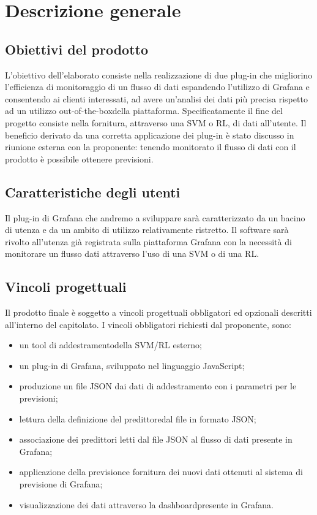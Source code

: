 \section{Descrizione generale}
   
	\subsection{Obiettivi del prodotto}
	L’obiettivo dell’elaborato consiste nella realizzazione di due plug-in che migliorino l’efficienza di monitoraggio di un flusso di dati espandendo l’utilizzo di Grafana e consentendo ai clienti  interessati, ad avere un’analisi dei dati più precisa rispetto ad un utilizzo out-of-the-box\glo della piattaforma. Specificatamente il fine del progetto consiste nella fornitura, attraverso una SVM o RL, di dati all’utente. Il beneficio derivato da una corretta applicazione dei plug-in è stato discusso in riunione esterna con la proponente: tenendo monitorato il flusso di dati con il prodotto è possibile ottenere previsioni. 
	\subsection{Caratteristiche degli utenti}
	Il plug-in di Grafana che andremo a sviluppare sarà caratterizzato da un bacino di utenza e da un ambito di utilizzo relativamente ristretto.
Il software sarà rivolto all’utenza già registrata sulla piattaforma Grafana con la necessità di monitorare un flusso dati attraverso l’uso di una SVM o di una RL.

	 \subsection{Vincoli progettuali}
	 Il prodotto finale è soggetto a vincoli progettuali obbligatori ed opzionali descritti all’interno del capitolato. I vincoli obbligatori richiesti dal proponente, sono:

	 	\begin{itemize}
			\item un tool di addestramento\glo della SVM/RL esterno;
	 		\item un plug-in di Grafana, sviluppato nel linguaggio JavaScript;
	 		\item produzione un file JSON dai dati di addestramento con i parametri per le previsioni;
			\item lettura della definizione del predittore\glo dal file in formato JSON;
			\item associazione dei predittori letti dal file JSON al flusso di dati presente in Grafana; 
			\item applicazione della previsione\glo e fornitura dei nuovi dati ottenuti al sistema di previsione di Grafana;
			\item visualizzazione dei dati attraverso la dashboard\glo presente in Grafana.
	 	\end{itemize}

